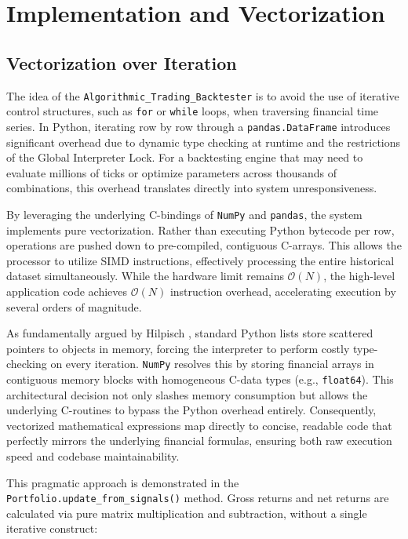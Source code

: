\chapter{Implementation and Vectorization}

\section{Vectorization over Iteration}

The idea of the \texttt{Algorithmic\_Trading\_Backtester} is to avoid the use of iterative control structures, such as \texttt{for} or \texttt{while} loops, when traversing financial time series. In Python, iterating row by row through a \texttt{pandas.DataFrame} introduces significant overhead due to dynamic type checking at runtime and the restrictions of the Global Interpreter Lock. For a backtesting engine that may need to evaluate millions of ticks or optimize parameters across thousands of combinations, this overhead translates directly into system unresponsiveness.

By leveraging the underlying C-bindings of \texttt{NumPy} and \texttt{pandas}, the system implements pure vectorization. Rather than executing Python bytecode per row, operations are pushed down to pre-compiled, contiguous C-arrays. This allows the processor to utilize SIMD instructions, effectively processing the entire historical dataset simultaneously. While the hardware limit remains \(\mathcal{O}(N)\), the high-level application code achieves \(\mathcal{O}(N)\) instruction overhead, accelerating execution by several orders of magnitude.

As fundamentally argued by Hilpisch \cite{hilpisch2018}, standard Python lists store scattered pointers to objects in memory, forcing the interpreter to perform costly type-checking on every iteration. \texttt{NumPy} resolves this by storing financial arrays in contiguous memory blocks with homogeneous C-data types (e.g., \texttt{float64}). This architectural decision not only slashes memory consumption but allows the underlying C-routines to bypass the Python overhead entirely. Consequently, vectorized mathematical expressions map directly to concise, readable code that perfectly mirrors the underlying financial formulas, ensuring both raw execution speed and codebase maintainability.

This pragmatic approach is demonstrated in the \texttt{Portfolio.update\_from\_signals()} method. Gross returns and net returns are calculated via pure matrix multiplication and subtraction, without a single iterative construct:

